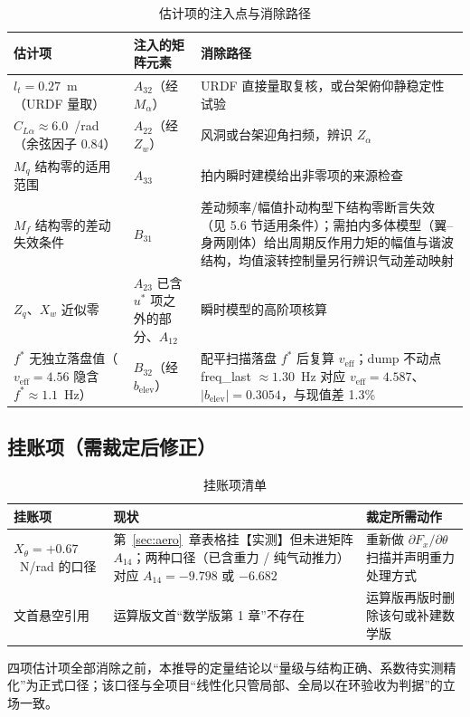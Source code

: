 \documentclass[11pt,a4paper]{ctexart}
\begin{document}
\begin{table}[htbp]
\centering\small
\begin{tabularx}{\textwidth}{lXX}
\toprule
估计项 & 注入的矩阵元素 & 消除路径 \\
\midrule
$l_t=0.27$~m（URDF 量取） & $A_{32}$（经 $M_\alpha$） & URDF 直接量取复核，或台架俯仰静稳定性试验 \\
$C_{L\alpha}\approx 6.0$~/rad（余弦因子 0.84） & $A_{22}$（经 $Z_w$） & 风洞或台架迎角扫频，辨识 $Z_\alpha$ \\
$M_q$ 结构零的适用范围 & $A_{33}$ & 拍内瞬时建模给出非零项的来源检查 \\
$M_f$ 结构零的差动失效条件 & $B_{31}$ & 差动频率/幅值扑动构型下结构零断言失效（见 5.6 节适用条件）；需拍内多体模型（翼--身两刚体）给出周期反作用力矩的幅值与谐波结构，均值滚转控制量另行辨识气动差动映射 \\
$Z_q$、$X_w$ 近似零 & $A_{23}$ 已含 $u^{*}$ 项之外的部分、$A_{12}$ & 瞬时模型的高阶项核算 \\
$f^{*}$ 无独立落盘值（$v_{\mathrm{eff}}=4.56$ 隐含 $f^{*}\approx 1.1$~Hz） & $B_{32}$（经 $b_{\mathrm{elev}}$） & 配平扫描落盘 $f^{*}$ 后复算 $v_{\mathrm{eff}}$；dump 不动点 freq\_last $\approx 1.30$~Hz 对应 $v_{\mathrm{eff}}=4.587$、$|b_{\mathrm{elev}}|=0.3054$，与现值差 1.3\% \\
\bottomrule
\end{tabularx}
\caption{估计项的注入点与消除路径}
\end{table}

\subsection{挂账项（需裁定后修正）}

\begin{table}[htbp]
\centering\small
\begin{tabularx}{\textwidth}{XXl}
\toprule
挂账项 & 现状 & 裁定所需动作 \\
\midrule
$X_\theta=+0.67$~N/rad 的口径 & 第~\ref{sec:aero}~章表格挂【实测】但未进矩阵 $A_{14}$；两种口径（已含重力 / 纯气动推力）对应 $A_{14}=-9.798$ 或 $-6.682$ & 重新做 $\partial F_x/\partial\theta$ 扫描并声明重力处理方式 \\
文首悬空引用 & 运算版文首“数学版第 1 章”不存在 & 运算版再版时删除该句或补建数学版 \\
\bottomrule
\end{tabularx}
\caption{挂账项清单}
\end{table}

四项估计项全部消除之前，本推导的定量结论以“量级与结构正确、系数待实测精化”为正式口径；该口径与全项目“线性化只管局部、全局以在环验收为判据”的立场一致。
\end{document}
